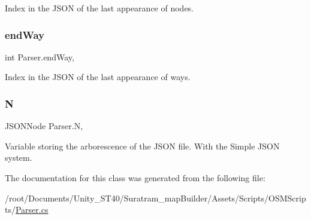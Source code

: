 Index in the J\+S\+ON of the last appearance of nodes.

\mbox{\label{classParser_a4df695e129b4f2ea2246a09aa1efa7d9}} 
\subsubsection{\texorpdfstring{end\+Way}{endWay}}
{\footnotesize\ttfamily int Parser.\+end\+Way\hspace{0.3cm}{\ttfamily [get]}, {}}



Index in the J\+S\+ON of the last appearance of ways.

\mbox{\label{classParser_a4197d6b1f20ecece4727304bd48919b2}} 
\subsubsection{\texorpdfstring{N}{N}}
{\footnotesize\ttfamily J\+S\+O\+N\+Node Parser.\+N\hspace{0.3cm}{\ttfamily [get]}, {}}



Variable storing the arborescence of the J\+S\+ON file. With the Simple J\+S\+ON system.



The documentation for this class was generated from the following file\+:\begin{DoxyCompactItemize}
\item 
/root/\+Documents/\+Unity\+\_\+\+S\+T40/\+Suratram\+\_\+map\+Builder/\+Assets/\+Scripts/\+O\+S\+M\+Scripts/\hyperlink{Parser_8cs}{Parser.\+cs}\end{DoxyCompactItemize}
